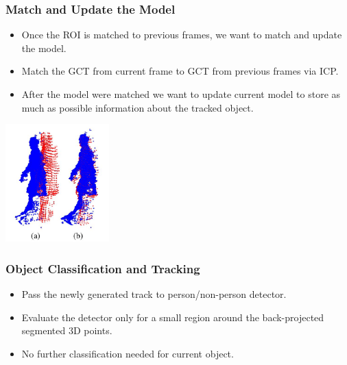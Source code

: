 \documentclass{beamer}
\begin{document}
\begin{frame}
\frametitle{Match and Update the Model} 

\begin{itemize}
  \item Once the ROI is matched to previous frames, we want to match and update the model.
  \item Match the GCT from current frame to GCT from previous frames via ICP.
  \item After the model were matched we want to update current model to store as much as possible information about the tracked object.
\end{itemize}
\begin{center}
  \includegraphics[width=4cm]{registration.jpg}
\end{center}
\end{frame}

\begin{frame}
\frametitle{Object Classification and Tracking} 

\begin{itemize}
  \item Pass the newly generated track to person/non-person detector. 
  \item Evaluate the detector only for a small region around the back-projected segmented 3D points.
  \item No further classification needed for current object.
\end{itemize}
\end{frame}
\end{document}
